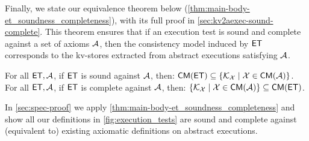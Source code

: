 Finally, we state our equivalence theorem below (\cref{thm:main-body-et_soundness_completeness}), with its full proof in \cref{sec:kv2aexec-sound-complete}. 
This theorem ensures that if an execution test is sound and complete against a set of axioms $\mathcal{A}$, 
then the consistency model induced by $\mathsf{ET}$ corresponds to the kv-stores extracted from abstract executions satisfying $\mathcal{A}$.

\begin{theorem}
\label{thm:main-body-et_soundness_completeness}
For all $\mathsf{ET}, \mathcal{A}$, if $\mathsf{ET}$ is sound against $\mathcal{A}$, then:
\(
    \mathsf{CM}(\mathsf{ET}) \subseteq \{ \mathcal{K}_{\mathcal{X}} \mid \mathcal{X} \in \mathsf{CM}(\mathcal{A})\}
\).
For all $\mathsf{ET}, \mathcal{A}$, if $\mathsf{ET}$ is complete against $\mathcal{A}$, then:
\(
    \{ \mathcal{K}_{\mathcal{X}} \mid \mathcal{X} \in \mathsf{CM}(\mathcal{A})\}  \subseteq \mathsf{CM}(\mathsf{ET})
\).
\end{theorem} 

In \cref{sec:spec-proof} we apply \cref{thm:main-body-et_soundness_completeness} and show all our definitions in \cref{fig:execution_tests} 
are sound and complete against (equivalent to) existing axiomatic definitions on abstract executions.

